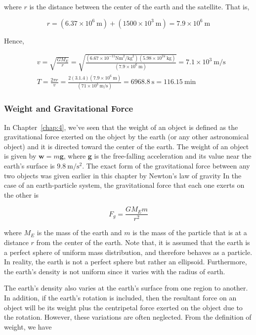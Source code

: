 \documentclass[10pt]{article}
\numberwithin{equation}{section}
\begin{document}
where $r$ is the distance between the center of the earth and the satellite. That is,

$$
r=\left(6.37 \times 10^{6} \mathrm{~m}\right)+\left(1500 \times 10^{3} \mathrm{~m}\right)=7.9 \times 10^{6} \mathrm{~m}
$$

Hence,

$$
\begin{aligned}
& v=\sqrt{\frac{G M_{E}}{r}}=\sqrt{\frac{\left(6.67 \times 10^{-11} \mathrm{Nm}^{2} / \mathrm{kg}^{2}\right)\left(5.98 \times 10^{24} \mathrm{~kg}\right)}{\left(7.9 \times 10^{6} \mathrm{~m}\right)}}=7.1 \times 10^{3} \mathrm{~m} / \mathrm{s} \\
& T=\frac{2 \pi r}{v}=\frac{2(3.1 .4)\left(7.9 \times 10^{6} \mathrm{~m}\right)}{\left(71 \times 10^{3} \mathrm{~m} / \mathrm{s}\right)}=6968.8 \mathrm{~s}=116.15 \mathrm{~min}
\end{aligned}
$$

\subsubsection{Weight and Gravitational Force}\label{sec:9-2-3}
In Chapter~\ref{chap:4}, we've seen that the weight of an object is defined as the gravitational force exerted on the object by the earth (or any other astronomical object) and it is directed toward the center of the earth. The weight of an object is given by $\mathbf{w}=m \mathbf{g}$, where $\mathbf{g}$ is the free-falling acceleration and its value near the earth's surface is $9.8 \mathrm{~m} / \mathrm{s}^{2}$. The exact form of the gravitational force between any two objects was given earlier in this chapter by Newton's law of gravity In the case of an earth-particle system, the gravitational force that each one exerts on the other is

$$
F_{g}=\frac{G M_{E} m}{r^{2}}
$$

where $M_{E}$ is the mass of the earth and $m$ is the mass of the particle that is at a distance $r$ from the center of the earth. Note that, it is assumed that the earth is a perfect sphere of uniform mass distribution, and therefore behaves as a particle. In reality, the earth is not a perfect sphere but rather an ellipsoid. Furthermore, the earth's density is not uniform since it varies with the radius of earth.

The earth's density also varies at the earth's surface from one region to another. In addition, if the earth's rotation is included, then the resultant force on an object will be its weight plus the centripetal force exerted on the object due to the rotation. However, these variations are often neglected. From the definition of weight, we have
\end{document}
